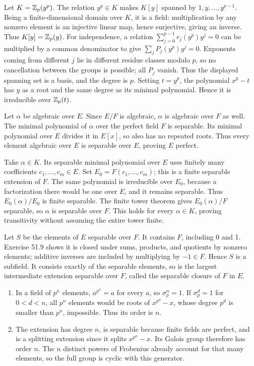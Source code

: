 Let $K=\mathbb{Z}_p(y^p)$. The relation $y^p\in K$ makes $K[y]$ spanned by $1,y,\ldots,y^{p-1}$. Being a finite-dimensional domain over $K$, it is a field: multiplication by any nonzero element is an injective linear map, hence surjective, giving an inverse. Thus $K[y]=\mathbb{Z}_p(y)$.
For independence, a relation $\sum_{j=0}^{p-1}r_j(y^p)y^j=0$ can be multiplied by a common denominator to give $\sum_jP_j(y^p)y^j=0$. Exponents coming from different $j$ lie in different residue classes modulo $p$, so no cancellation between the groups is possible; all $P_j$ vanish. Thus the displayed spanning set is a basis, and the degree is $p$. Setting $t=y^p$, the polynomial $x^p-t$ has $y$ as a root and the same degree as its minimal polynomial. Hence it is irreducible over $\mathbb{Z}_p(t)$.

Let $\alpha$ be algebraic over $E$. Since $E/F$ is algebraic, $\alpha$ is algebraic over $F$ as well. The minimal polynomial of $\alpha$ over the perfect field $F$ is separable. Its minimal polynomial over $E$ divides it in $E[x]$, so also has no repeated roots. Thus every element algebraic over $E$ is separable over $E$, proving $E$ perfect.

Take $\alpha\in K$. Its separable minimal polynomial over $E$ uses finitely many coefficients $c_1,\ldots,c_m\in E$. Set $E_0=F(c_1,\ldots,c_m)$; this is a finite separable extension of $F$. The same polynomial is irreducible over $E_0$, because a factorization there would be one over $E$, and it remains separable. Thus $E_0(\alpha)/E_0$ is finite separable. The finite tower theorem gives $E_0(\alpha)/F$ separable, so $\alpha$ is separable over $F$. This holds for every $\alpha\in K$, proving transitivity without assuming the entire tower finite.

Let $S$ be the elements of $E$ separable over $F$. It contains $F$, including 0 and 1. Exercise 51.9 shows it is closed under sums, products, and quotients by nonzero elements; additive inverses are included by multiplying by $-1\in F$. Hence $S$ is a subfield. It consists exactly of the separable elements, so is the largest intermediate extension separable over $F$, called the separable closure of $F$ in $E$.

\begin{enumerate}[label=(\alph*)]
\item In a field of $p^n$ elements, $a^{p^n}=a$ for every $a$, so $\sigma_p^n=1$. If $\sigma_p^d=1$ for $0<d<n$, all $p^n$ elements would be roots of $x^{p^d}-x$, whose degree $p^d$ is smaller than $p^n$, impossible. Thus its order is $n$.
\item The extension has degree $n$, is separable because finite fields are perfect, and is a splitting extension since it splits $x^{p^n}-x$. Its Galois group therefore has order $n$. The $n$ distinct powers of Frobenius already account for that many elements, so the full group is cyclic with this generator.
\end{enumerate}

